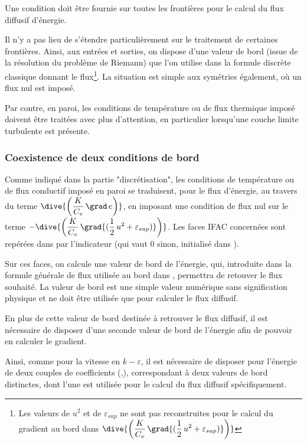 Une condition doit être fournie sur toutes les frontières pour le calcul du
flux diffusif d'énergie.

Il n'y a pas lieu de
s'étendre particulièrement sur le traitement de certaines frontières.
Ainsi, aux entrées et sorties, on dispose
d'une valeur de bord (issue de la résolution du problème
de Riemann)
que l'on utilise dans la formule discrète classique donnant le
flux\footnote{Les valeurs de $u^2$ et de $\varepsilon_{sup}$ ne sont pas
reconstruites pour le calcul du gradient au bord dans
$\displaystyle\dive{\left(\frac{K}{C_v}\,\grad{(\frac{1}{2}\,u^2+\varepsilon_{sup})}\right)}$}.
La situation est simple aux symétries également, où un flux nul est imposé.

Par contre, en paroi, les conditions de température ou de flux thermique
imposé doivent être traitées avec plus d'attention, en particulier
lorsqu'une couche limite turbulente est présente.

\subsubsection*{Coexistence de deux conditions de bord}

Comme indiqué dans la partie "discrétisation",
les conditions de température ou de flux conductif
imposé en paroi se traduisent,
pour le flux d'énergie, au travers du terme
$\displaystyle\dive{\left(\frac{K}{C_v}\,\grad\,e\right)}$,
en imposant une condition de flux nul sur le terme
$\displaystyle-\dive{\left(\frac{K}{C_v}\,\grad{(\frac{1}{2}\,u^2+\varepsilon_{sup})}\right)}$.
Les faces IFAC
concernées sont repérées dans  par l'indicateur
 (qui vaut 0 sinon, initialisé
dans ).

Sur ces faces,
on calcule une valeur de bord de l'énergie, qui, introduite dans la
formule générale de flux utilisée au bord dans \CS, permettra de retouver le
flux souhaité. La valeur de bord est une simple valeur numérique sans
signification physique et ne doit être utilisée que pour calculer le flux
diffusif.

En plus de cette valeur de bord destinée à retrouver le
flux diffusif, il est nécessaire de disposer
d'une seconde valeur de bord de l'énergie afin de pouvoir en calculer le
gradient.

Ainsi, comme pour la vitesse en $k-\varepsilon$, il est nécessaire de
disposer pour l'énergie de deux couples de coefficients
(,), correspondant à deux valeurs de bord distinctes,
dont l'une est utilisée pour le calcul du flux diffusif spécifiquement.

